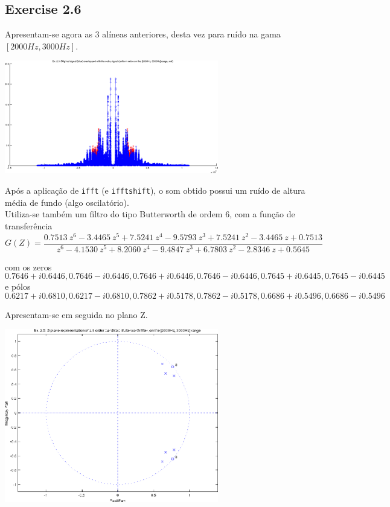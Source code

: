 \documentclass[a4paper]{article}
\begin{document}
\subsection{Exercise 2.6}
\noindent Apresentam-se agora as 3 alíneas anteriores, desta vez para ruído na gama $[2000Hz, 3000Hz]$.
\begin{center}
	\includegraphics[width=0.70\textwidth]{images/ex_2_3_bandstop.png}
	\label{fig:ex_2_3_bandstop}
\end{center}

\noindent Após a aplicação de \texttt{ifft} (e \texttt{ifftshift}), o som obtido possui um ruído de altura média de fundo (algo oscilatório). \\
\noindent Utiliza-se também um filtro do tipo Butterworth de ordem 6, com a função de transferência
\begin{equation}
G(Z) = \frac{0.7513~z^6 - 3.4465~z^5 + 7.5241~z^4 - 9.5793~z^3 + 7.5241~z^2 - 3.4465~z + 0.7513}{z^6 - 4.1530~z^5 + 8.2060~z^4 - 9.4847~z^3 + 6.7803~z^2 - 2.8346~z + 0.5645}
\end{equation}

\noindent com os zeros \[0.7646 + i0.6446, 0.7646 - i0.6446, 0.7646 + i0.6446, 0.7646 - i0.6446, 0.7645 + i0.6445, 0.7645 - i0.6445\] e pólos \[0.6217 + i0.6810, 0.6217 - i0.6810, 0.7862 + i0.5178, 0.7862 - i0.5178, 0.6686 + i0.5496, 0.6686 - i0.5496\]

\clearpage

\noindent Apresentam-se em seguida no plano Z.
\begin{center}
	\includegraphics[width=0.70\textwidth]{images/ex_2_5_bandstop_zplane.png}
	\label{fig:ex_2_5_bandstop_zplane}
\end{center}
\end{document}
